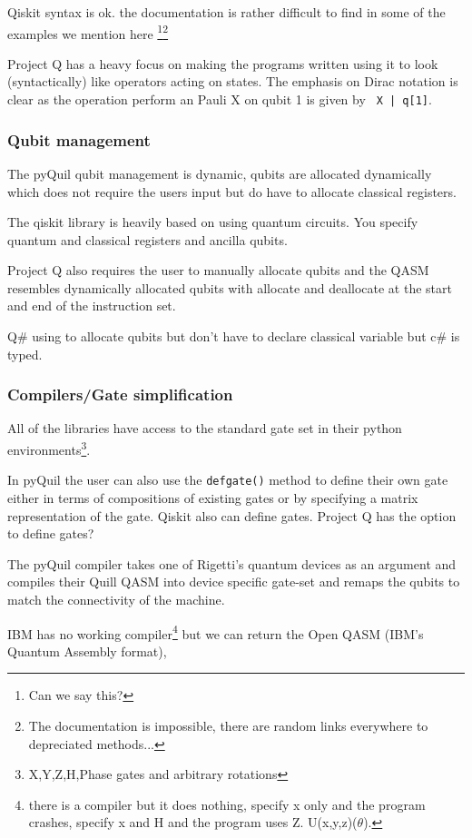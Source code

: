 Qiskit syntax is ok. the documentation is rather difficult to find in some of the examples we mention here \footnote{Can we say this?}\footnote{The documentation is impossible, there are random links everywhere to depreciated methods...}

Project Q has a heavy focus on making the programs written using it to look (syntactically) like operators acting on states. The emphasis on Dirac notation is clear as the operation perform an Pauli X on qubit 1 is given by \texttt{ X | q[1]}.

\subsubsection{Qubit management}

The pyQuil qubit management is dynamic, qubits are allocated dynamically which does not require the users input but do have to allocate classical registers. 

The qiskit library is heavily based on using quantum circuits. You specify quantum and classical registers and ancilla qubits. 

Project Q also requires the user to manually allocate qubits and the QASM resembles dynamically allocated qubits with allocate and deallocate at the start and end of the instruction set. 

Q\# using to allocate qubits but don't have to declare classical variable but c\# is typed.
\subsubsection{Compilers/Gate simplification}

All of the libraries have access to the standard gate set in their python environments\footnote{X,Y,Z,H,Phase gates and arbitrary rotations}. 

In pyQuil the user can also use the \texttt{defgate()} method to define their own gate either in terms of compositions of existing gates or by specifying a matrix representation of the gate. Qiskit also can define gates. Project Q has the option to define gates?


The pyQuil compiler takes one of Rigetti's quantum devices as an argument and compiles their Quill QASM into device specific gate-set and remaps the qubits to match the connectivity of the machine.

IBM has no working compiler\footnote{there is a compiler but it does nothing, specify x only and the program crashes, specify x and H and the program uses Z. U(x,y,z)($\theta$).} but we can return the Open QASM (IBM's Quantum Assembly format), 


